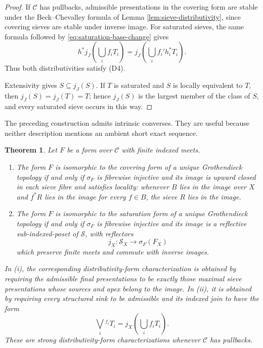 \documentclass[12pt,oneside,reqno]{amsart}
\newtheorem{theorem}{Theorem}[section]
\theoremstyle{definition}
\theoremstyle{remark}
\newcommand{\C}{\mathcal C}
\newcommand{\Sieve}{\mathscr S}
\begin{document}
\begin{proof}
If \(\C\) has pullbacks, admissible presentations in the covering form
are stable under the Beck--Chevalley formula of Lemma
\ref{lem:sieve-distributivity}, since covering sieves are stable under
inverse image.  For saturated sieves, the same formula followed by
\eqref{eq:saturation-base-change} gives
\[
 h^*j_J\!\left(\bigcup_i f_iT_i\right)
  =j_J\!\left(\bigcup_i f_i'h_i^*T_i\right).
\]
Thus both distributivities satisfy (D4).

Extensivity gives \(S\subseteq j_J(S)\).  If \(T\) is saturated and
\(S\) is locally equivalent to \(T\), then
\(j_J(S)=j_J(T)=T\); hence \(j_J(S)\) is the largest member of the
class of \(S\), and every saturated sieve occurs in this way.
\end{proof}

The preceding construction admits intrinsic converses.  They are useful
because neither description mentions an ambient short exact sequence.

\begin{theorem}\label{thm:characterize-GT-forms}
Let \(F\) be a form over \(\C\) with finite indexed meets.
\begin{enumerate}[label=\textup{(\roman*)}]
\item The form \(F\) is isomorphic to the covering form of a unique
Grothendieck topology if and only if \(\sigma_F\) is fibrewise injective
and its image is upward closed in each sieve fibre and satisfies
locality: whenever \(B\) lies in the image over \(X\) and \(f^*R\) lies
in the image for every \(f\in B\), the sieve \(R\) lies in the image.
\item The form \(F\) is isomorphic to the saturation form of a unique
Grothendieck topology if and only if \(\sigma_F\) is fibrewise injective
and its image is a reflective sub-indexed-poset of \(\Sieve\), with
reflectors
\[
                 j_X:\Sieve_X\longrightarrow\sigma_F(F_X)
\]
which preserve finite meets and commute with inverse images.
\end{enumerate}
In \textup{(i)}, the corresponding distributivity-form
characterization is obtained by requiring the admissible final
presentations to be exactly those maximal sieve presentations whose
sources and apex belong to the image.  In \textup{(ii)}, it is obtained
by requiring every structured sink to be admissible and its indexed
join to have the form
\[
       \bigvee_i{}^{f_i}T_i
         =j_X\!\left(\bigcup_i f_iT_i\right).
\]
These are strong distributivity-form characterizations whenever \(\C\)
has pullbacks.
\end{theorem}
\end{document}
